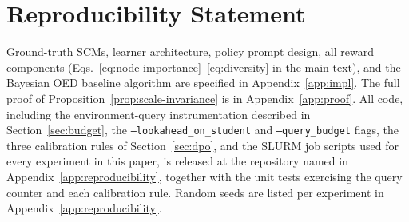 \documentclass{article}
\theoremstyle{plain}
\theoremstyle{definition}
\theoremstyle{remark}
\begin{document}
\section*{Reproducibility Statement}

Ground-truth SCMs, learner architecture, policy prompt design, all reward components (Eqs.~\ref{eq:node-importance}--\ref{eq:diversity} in the main text), and the Bayesian OED baseline algorithm are specified in Appendix~\ref{app:impl}. The full proof of Proposition~\ref{prop:scale-invariance} is in Appendix~\ref{app:proof}. All code, including the environment-query instrumentation described in Section~\ref{sec:budget}, the \texttt{--lookahead\_on\_student} and \texttt{--query\_budget} flags, the three calibration rules of Section~\ref{sec:dpo}, and the SLURM job scripts used for every experiment in this paper, is released at the repository named in Appendix~\ref{app:reproducibility}, together with the unit tests exercising the query counter and each calibration rule. Random seeds are listed per experiment in Appendix~\ref{app:reproducibility}.




\appendix

\end{document}
